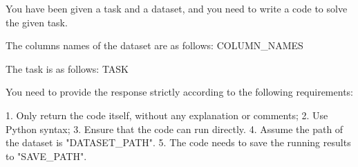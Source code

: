 
\begin{tcolorbox}[colback=cadmiumgreen!5!white,colframe=forestgreen!75!white,breakable,title=\textit{Prompt for instructing the single LLM to solve tasks.}]
\begin{VerbatimWrap}
You have been given a task and a dataset, and you need to write a code to solve the given task.

The columns names of the dataset are as follows:
{{COLUMN_NAMES}}

The task is as follows:
{{TASK}}

You need to provide the response strictly according to the following requirements:

1. Only return the code itself, without any explanation or comments;
2. Use Python syntax;
3. Ensure that the code can run directly.
4. Assume the path of the dataset is "{{DATASET_PATH}}". 
5. The code needs to save the running results to "{{SAVE_PATH}}".
\end{VerbatimWrap}
\end{tcolorbox}